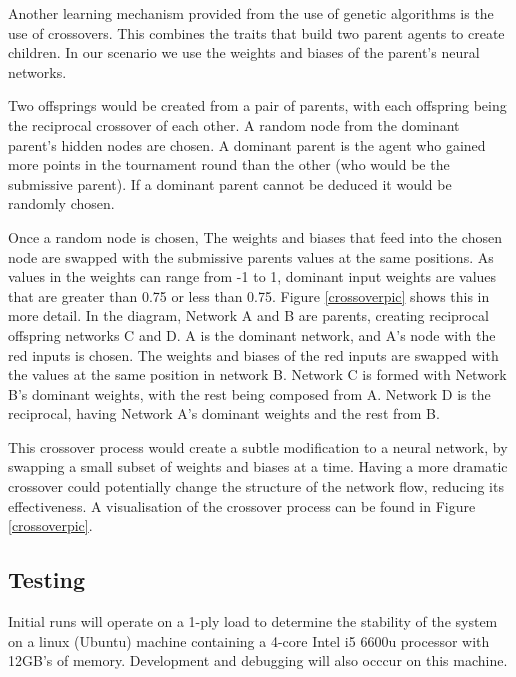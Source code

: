\documentclass[12pt,a4paper]{article}
\begin{document}
            Another learning mechanism provided from the use of genetic algorithms is the use of crossovers. This combines the traits that build two parent agents to create children. In our scenario we use the weights and biases of the parent's neural networks.

            Two offsprings would be created from a pair of parents, with each offspring being the reciprocal crossover of each other. 
            A random node from the dominant parent's hidden nodes are chosen. A dominant parent is the agent who gained more points in the tournament round than the other (who would be the submissive parent). If a dominant parent cannot be deduced it would be randomly chosen. 

            Once a random node is chosen, The weights and biases that feed into the chosen node are swapped with the submissive parents values at the same positions. As values in the weights can range from -1 to 1, dominant input weights are values that are greater than 0.75 or less than 0.75. 
            Figure \ref{crossoverpic} shows this in more detail. In the diagram, Network A and B are parents, creating reciprocal offspring networks C and D. A is the dominant network, and A's node with the red inputs is chosen. The weights and biases of the red inputs are swapped with the values at the same position in network B. Network C is formed with Network B's dominant weights, with the rest being composed from A. Network D is the reciprocal, having Network A's dominant weights and the rest from B.

            This crossover process would create a subtle modification to a neural network, by swapping a small subset of weights and biases at a time. Having a more dramatic crossover could potentially change the structure of the network flow, reducing its effectiveness. A visualisation of the crossover process can be found in Figure \ref{crossoverpic}.
            

    \subsection{Testing}
        Initial runs will operate on a 1-ply load to determine the stability of the system on a linux (Ubuntu) machine containing a 4-core Intel i5 6600u processor with 12GB's of memory. Development and debugging will also occcur on this machine. 
        
\end{document}
